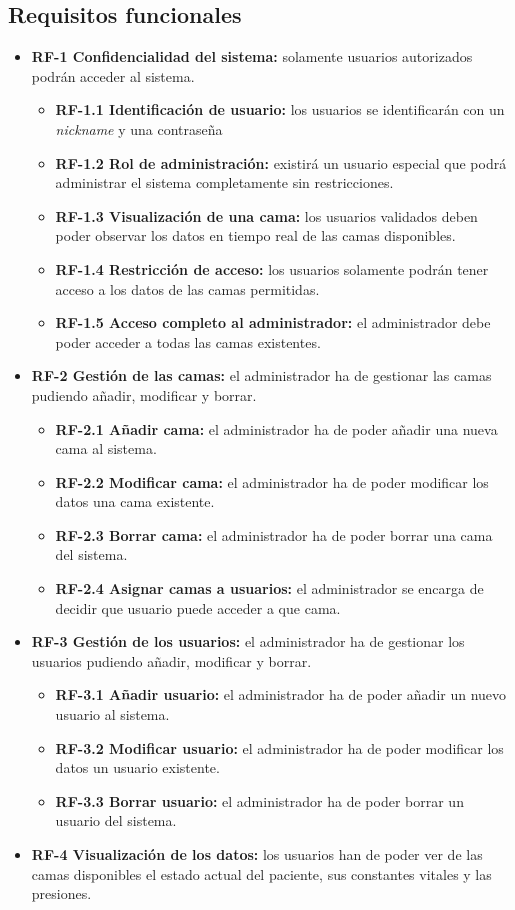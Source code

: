 \subsection{Requisitos funcionales}\label{requisitos-funcionales}
\begin{itemize}
\tightlist
\item
\textbf{RF-1 Confidencialidad del sistema:} solamente usuarios autorizados podrán acceder al sistema.
	\begin{itemize}
		\tightlist
		\item
		\textbf{RF-1.1 Identificación de usuario:} los usuarios se identificarán con un \textit{nickname} y una contraseña 
		\item
		\textbf{RF-1.2 Rol de administración:} existirá un usuario especial que podrá administrar el sistema completamente sin restricciones.
		\item 
		\textbf{RF-1.3 Visualización de una cama:} los usuarios validados deben poder observar los datos en tiempo real de las camas disponibles. 
		\item
		\textbf{RF-1.4 Restricción de acceso:} los usuarios solamente podrán tener acceso a los datos de las camas permitidas. 
		\item
		\textbf{RF-1.5 Acceso completo al administrador:} el administrador debe poder acceder a todas las camas existentes. 
	\end{itemize}	
\item
\textbf{RF-2 Gestión de las camas:} el administrador ha de gestionar las camas pudiendo añadir, modificar y borrar.
	\begin{itemize}
		\tightlist
		\item
		\textbf{RF-2.1 Añadir cama:} el administrador ha de poder añadir una nueva cama al sistema.
		\item
		\textbf{RF-2.2 Modificar cama:} el administrador ha de poder modificar los datos una cama existente.
		\item
		\textbf{RF-2.3 Borrar cama:} el administrador ha de poder borrar una cama del sistema.
		\item
		\textbf{RF-2.4 Asignar camas a usuarios:} el administrador se encarga de decidir que usuario puede acceder a que cama.
	\end{itemize}
\item
\textbf{RF-3 Gestión de los usuarios:} el administrador ha de gestionar los usuarios pudiendo añadir, modificar y borrar.
	\begin{itemize}
		\tightlist
		\item
		\textbf{RF-3.1 Añadir usuario:} el administrador ha de poder añadir un nuevo usuario al sistema.
		\item
		\textbf{RF-3.2 Modificar usuario:} el administrador ha de poder modificar los datos un usuario existente.
		\item
		\textbf{RF-3.3 Borrar usuario:} el administrador ha de poder borrar un usuario del sistema.
	\end{itemize}
\item 
\textbf{RF-4 Visualización de los datos:} los usuarios han de poder ver de las camas disponibles el estado actual del paciente, sus constantes vitales y las presiones.
\end{itemize}	
